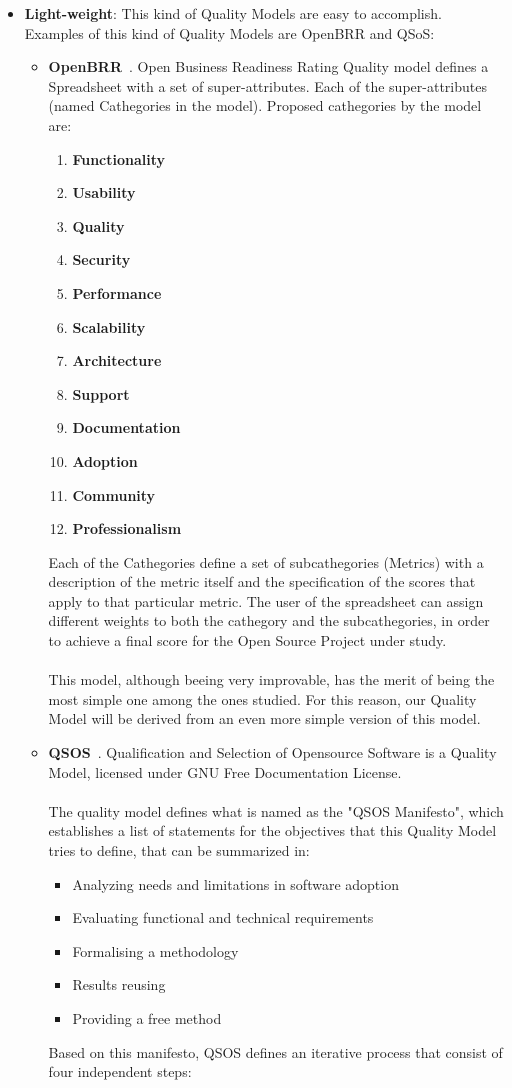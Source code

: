\documentclass[11pt]{article}
\begin{document}
\begin{itemize}\itemsep0pt
\item{\textbf{Light-weight}}: This kind of Quality Models are easy to accomplish. Examples of this kind of Quality Models are OpenBRR and QSoS:
\begin{itemize}\itemsep0pt
\item{\textbf{OpenBRR}}~\cite{OPENBRR00}.
Open Business Readiness Rating Quality model defines a Spreadsheet with a set of super-attributes. Each of the super-attributes (named Cathegories in the model). Proposed cathegories by the model are:
\begin{enumerate}\itemsep0pt
\item{\textbf{Functionality}}
\item{\textbf{Usability}}
\item{\textbf{Quality}}
\item{\textbf{Security}}
\item{\textbf{Performance}}
\item{\textbf{Scalability}}
\item{\textbf{Architecture}}
\item{\textbf{Support}}
\item{\textbf{Documentation}}
\item{\textbf{Adoption}}
\item{\textbf{Community}}
\item{\textbf{Professionalism}}
\end{enumerate}
Each of the Cathegories define a set of subcathegories (Metrics) with a description of the metric itself and the specification of the scores that apply to that particular metric. The user of the spreadsheet can assign different weights to both the cathegory and the subcathegories, in order to achieve a final score for the Open Source Project under study.\\
\\
This model, although beeing very improvable, has the merit of being the most simple one among the ones studied. For this reason, our Quality Model will be derived from an even more simple version of this model.
\item{\textbf{QSOS}}~\cite{QSOS00}. Qualification and Selection of Opensource Software is a Quality Model, licensed under GNU Free Documentation License.\\
\\
The quality model defines what is named as the "QSOS Manifesto", which establishes a list of statements for the objectives that this Quality Model tries to define, that can be summarized in:
\begin{itemize}\itemsep0pt
\item{Analyzing needs and limitations in software adoption}
\item{Evaluating functional and technical requirements}
\item{Formalising a methodology}
\item{Results reusing}
\item{Providing a free method}
\end{itemize}
Based on this manifesto, QSOS defines an iterative process that consist of four independent steps:


\end{itemize}
\end{itemize}
\end{document}
